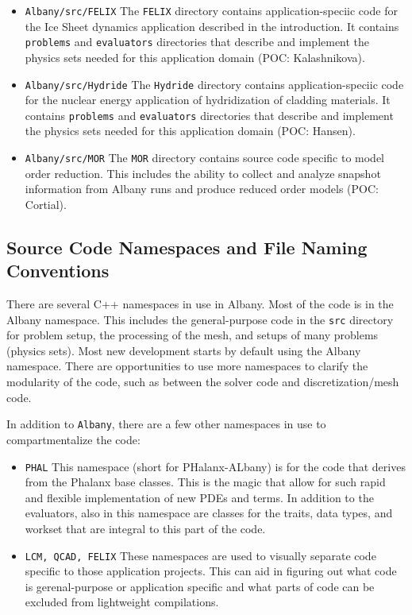 \documentclass[pdf,12pt,report,strict]{SANDreport}
\theoremstyle{remark}
\begin{document}
\begin{itemize}
\item{\texttt{Albany/src/FELIX}}  The \texttt{FELIX} directory contains application-speciic
code for the Ice Sheet dynamics application described in the introduction. It contains
 \texttt{problems} and \texttt{evaluators} directories that describe and implement
the physics sets needed for this application domain (POC: Kalashnikova).

\item{\texttt{Albany/src/Hydride}}  The \texttt{Hydride} directory contains application-speciic
code for the nuclear energy application of hydridization of cladding materials. It contains
 \texttt{problems} and \texttt{evaluators} directories that describe and implement
the physics sets needed for this application domain (POC: Hansen).

\item{\texttt{Albany/src/MOR}}  The \texttt{MOR} directory contains source code specific
to model order reduction. This includes the ability to collect and analyze snapshot
information from Albany runs and produce reduced order models (POC: Cortial). 

\end{itemize}
  
\subsection{Source Code Namespaces and File Naming Conventions}

There are several C++ namespaces in use in Albany. Most of the code
is in the Albany namespace. This includes the general-purpose code in
the \texttt{src} directory for problem setup, the processing of the
mesh, and setups of many problems (physics sets). Most new development
starts by default using the Albany namespace. There are opportunities
to use more namespaces to clarify the modularity of the code, such
as between the solver code and discretization/mesh code. 

In addition to \texttt{Albany}, there are a few other namespaces in 
use to compartmentalize the code:
\begin{itemize}
\item{\texttt{PHAL}}  This namespace (short for PHalanx-ALbany) is for the
code that derives from the Phalanx base classes. This is the magic that 
allow for such rapid and flexible implementation of new PDEs and terms.
In addition to the evaluators, also in this namespace are classes for
the traits, data types, and workset that are integral to this part of the
code.

\item{\texttt{LCM, QCAD, FELIX}} These namespaces are used to visually separate 
code specific to those application projects. This can aid in figuring out
what code is gerenal-purpose or application specific and what parts of code can
be excluded from lightweight compilations.
\end{itemize}
\end{document}
